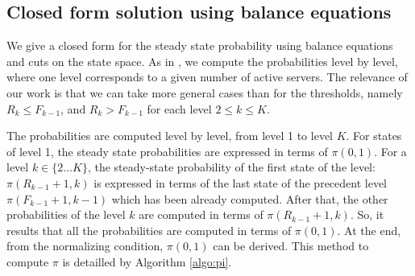 \documentclass[conference]{IEEEtran}
\begin{document}
\subsection{Closed form solution using balance equations} %
We give a closed form for the steady state probability using balance equations and cuts on the state space.
As in \cite{le2000simple}, we compute the probabilities level by level,
where one level corresponds to a given number of  active servers.
The relevance of our work is that we can take more general cases than \cite{le2000simple} for the thresholds,
namely $R_{k} \leq F_{k-1}$, and  $R_{k} > F_{k-1}$ for each level $2 \leq k \leq K$.

The probabilities are computed level by level, from level 1 to level $K$.
For states of level 1,  the steady state probabilities  are expressed in terms of $\pi(0,1)$. For a level
$k \in \{2 \ldots K\}$,
the steady-state probability of the  first state of the level: $\pi(R_{k-1}+1,k)$ is expressed in terms of the last state
of the precedent level $\pi(F_{k-1}+1,k-1)$ which has been already computed. After that, the other probabilities of the level
$k$ are computed in terms of $\pi(R_{k-1}+1,k)$. So, it results that all the probabilities  are computed in terms of
$\pi(0,1)$. At the end, from the normalizing condition, $\pi(0,1)$ can be derived.
This method to compute $\pi$ is detailled by Algorithm \ref{algo:pi}.
\end{document}
